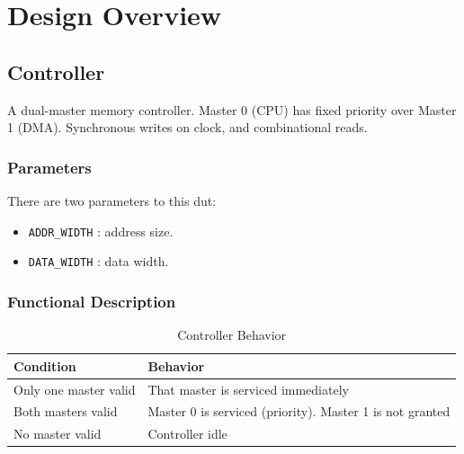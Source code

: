 \chapter{Design Overview} 
\label{cha:design_overview}

\section{Controller}

A dual-master memory controller.
Master 0 (CPU) has fixed priority over Master 1 (DMA). Synchronous writes on clock, and combinational reads.

\subsection{Parameters}

There are two parameters to this dut:

\begin{itemize}
    \item \texttt{ADDR\_WIDTH} : address size.
    \item \texttt{DATA\_WIDTH} : data width.
\end{itemize}

\subsection{Functional Description}

\begin{table}[H]
    \centering
    \begin{tabular}{|l|l|}
        \hline
        \textbf{Condition}      & \textbf{Behavior}                                         \\ \hline
        Only one master valid   & That master is serviced immediately                       \\ \hline
        Both masters valid      & Master 0 is serviced (priority). Master 1 is not granted  \\ \hline
        No master valid         & Controller idle                                           \\ \hline
    \end{tabular}
    \caption{Controller Behavior}
\end{table}

